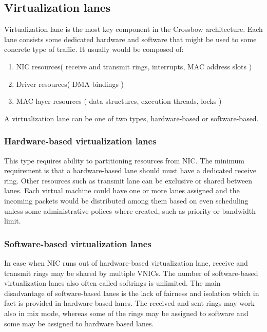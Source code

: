 \documentclass[11pt]{book}
\begin{document}
		\subsection{Virtualization lanes}

                        Virtualization lane is the most key component in the Crossbow architecture. Each lane consists some dedicated hardware and software that might be 
			used to some concrete type of traffic. It usually would be composed of: 
			\begin{enumerate}
				\item{NIC resources( receive and transmit rings, interrupts, MAC address slots )}
				\item{Driver resources( DMA bindings )}
				\item{MAC layer resources ( data structures, execution threads, locks )}
			\end{enumerate}
			
			A virtualization lane can be one of two types, hardware-based or software-based.
			
			\subsubsection{Hardware-based virtualization lanes}
			
			This type requires ability to partitioning resources from NIC. The minimum requirement is that a hardware-based lane should must have a dedicated receive ring.
			Other resources such as transmit lane can be exclusive or shared between lanes. Each virtual machine could have one or more lanes assigned and the incoming packets
			would be distributed among them based on even scheduling unless some administrative polices where created, such as priority or bandwidth limit.		
			
			\subsubsection{Software-based virtualization lanes}
			
			In case when NIC runs out of hardware-based virtualization lane, receive and transmit rings may be shared by multiple VNICs. The number of software-based virtualization 
			lanes also often called softrings is unlimited. The main disadvantage of software-based lanes is the lack of fairness and isolation which in fact is provided in hardware-based
			lanes. The received and sent rings may work also in mix mode, whereas some of the rings may be assigned to software and some may be assigned to hardware based lanes.	
			
\end{document}
